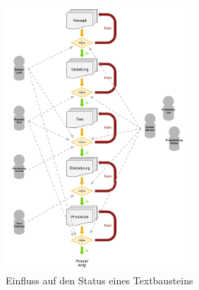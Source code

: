 \begin{figure}[htb]
\begin{center}
\includegraphics[width=0.6\textwidth]{media/WorkflowmitFeedback.pdf}
\end{center}
\caption{Einfluss auf den Status eines Textbausteins}
\label{chart:workflowmitfeedback}
\end{figure}

